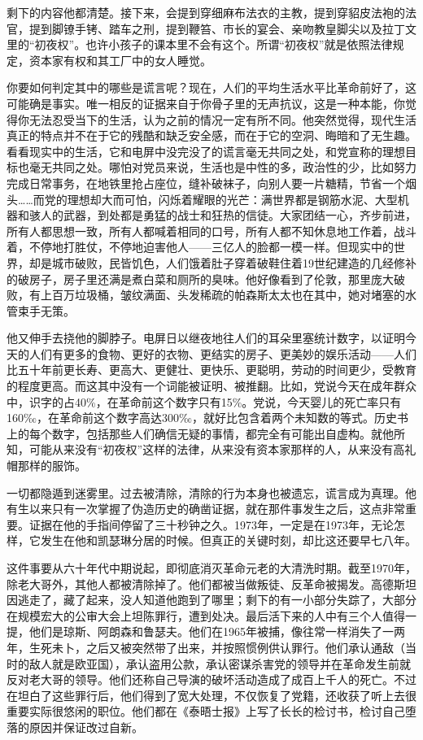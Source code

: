 剩下的内容他都清楚。接下来，会提到穿细麻布法衣的主教，提到穿貂皮法袍的法官，提到脚镣手铐、踏车之刑，提到鞭笞、市长的宴会、亲吻教皇脚尖以及拉丁文里的``初夜权''。也许小孩子的课本里不会有这个。所谓``初夜权''就是依照法律规定，资本家有权和其工厂中的女人睡觉。

你要如何判定其中的哪些是谎言呢？现在，人们的平均生活水平比革命前好了，这可能确是事实。唯一相反的证据来自于你骨子里的无声抗议，这是一种本能，你觉得你无法忍受当下的生活，认为之前的情况一定有所不同。他突然觉得，现代生活真正的特点并不在于它的残酷和缺乏安全感，而在于它的空洞、晦暗和了无生趣。看看现实中的生活，它和电屏中没完没了的谎言毫无共同之处，和党宣称的理想目标也毫无共同之处。哪怕对党员来说，生活也是中性的多，政治性的少，比如努力完成日常事务，在地铁里抢占座位，缝补破袜子，向别人要一片糖精，节省一个烟头\ldots\ldots 而党的理想却大而可怕，闪烁着耀眼的光芒：满世界都是钢筋水泥、大型机器和骇人的武器，到处都是勇猛的战士和狂热的信徒。大家团结一心，齐步前进，所有人都思想一致，所有人都喊着相同的口号，所有人都不知休息地工作着，战斗着，不停地打胜仗，不停地迫害他人——三亿人的脸都一模一样。但现实中的世界，却是城市破败，民皆饥色，人们饿着肚子穿着破鞋住着19世纪建造的几经修补的破房子，房子里还满是煮白菜和厕所的臭味。他好像看到了伦敦，那里庞大破败，有上百万垃圾桶，皱纹满面、头发稀疏的帕森斯太太也在其中，她对堵塞的水管束手无策。

他又伸手去挠他的脚脖子。电屏日以继夜地往人们的耳朵里塞统计数字，以证明今天的人们有更多的食物、更好的衣物、更结实的房子、更美妙的娱乐活动——人们比五十年前更长寿、更高大、更健壮、更快乐、更聪明，劳动的时间更少，受教育的程度更高。而这其中没有一个词能被证明、被推翻。比如，党说今天在成年群众中，识字的占40\%，在革命前这个数字只有15\%。党说，今天婴儿的死亡率只有160‰，在革命前这个数字高达300‰，就好比包含着两个未知数的等式。历史书上的每个数字，包括那些人们确信无疑的事情，都完全有可能出自虚构。就他所知，可能从来没有``初夜权''这样的法律，从来没有资本家那样的人，从来没有高礼帽那样的服饰。

一切都隐遁到迷雾里。过去被清除，清除的行为本身也被遗忘，谎言成为真理。他有生以来只有一次掌握了伪造历史的确凿证据，就在那件事发生之后，这点非常重要。证据在他的手指间停留了三十秒钟之久。1973年，一定是在1973年，无论怎样，它发生在他和凯瑟琳分居的时候。但真正的关键时刻，却比这还要早七八年。

这件事要从六十年代中期说起，即彻底消灭革命元老的大清洗时期。截至1970年，除老大哥外，其他人都被清除掉了。他们都被当做叛徒、反革命被揭发。高德斯坦因逃走了，藏了起来，没人知道他跑到了哪里；剩下的有一小部分失踪了，大部分在规模宏大的公审大会上坦陈罪行，遭到处决。最后活下来的人中有三个人值得一提，他们是琼斯、阿朗森和鲁瑟夫。他们在1965年被捕，像往常一样消失了一两年，生死未卜，之后又被突然带了出来，并按照惯例供认罪行。他们承认通敌（当时的敌人就是欧亚国），承认盗用公款，承认密谋杀害党的领导并在革命发生前就反对老大哥的领导。他们还称自己导演的破坏活动造成了成百上千人的死亡。不过在坦白了这些罪行后，他们得到了宽大处理，不仅恢复了党籍，还收获了听上去很重要实际很悠闲的职位。他们都在《泰晤士报》上写了长长的检讨书，检讨自己堕落的原因并保证改过自新。

